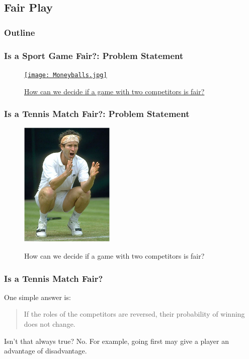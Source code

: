 \subsection{Fair Play}
\begin{frame}
    \frametitle{Outline}
\end{frame}

\begin{frame}
    \frametitle{Is a Sport Game Fair?: Problem Statement}
    \begin{figure}
        \caption{
            \href{http://www.youtube.com/watch?v=WNlCBy07z08}{
            How can we decide if a game with two competitors is fair?}
            }
            \centering
            \href{avmedia/nprnewssports.mp3}{
            \texttt{[image: Moneyballs.jpg]}
            }
    \end{figure}
\end{frame}



\begin{frame}
    \frametitle{Is a Tennis Match Fair?: Problem Statement}
    \begin{figure}
        \caption{How can we decide if a game with two competitors is fair?}
        \begin{center}
            \href{http://www.youtube.com/watch?v=ekQ_Ja02gTY}{
            \includegraphics[width=0.4\textwidth]{images/jmcenroe.jpg}}
        \end{center}
        \label{fig:FairGame}
    \end{figure}
\end{frame}


\begin{frame}
    \frametitle{Is a Tennis Match Fair?}
    One simple answer is: 
    \vskip0.2in
    \begin{verse}
        If the roles of the competitors are reversed,
        their probability of winning does not change.
    \end{verse}
    \vskip0.2in
    Isn't that always true?  No.  For example, going first may give a player
    an advantage of disadvantage.
\end{frame}

